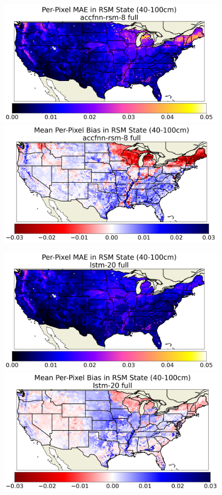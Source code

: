 \begin{figure}[hp!]
    \centering

    \includegraphics[width=.48\linewidth,draft=false]{figures/grid-eval_best_full/eval-grid_full_accfnn-rsm-8_rsm-100_spatial-stats_abs-err_state-err-abs-mean.png}
    \includegraphics[width=.48\linewidth,draft=false]{figures/grid-eval_best_full/eval-grid_full_accfnn-rsm-8_rsm-100_spatial-stats_bias_state-err-bias-mean.png}

    \includegraphics[width=.48\linewidth,draft=false]{figures/grid-eval_best_full/eval-grid_full_lstm-20_rsm-100_spatial-stats_abs-err_state-err-abs-mean.png}
    \includegraphics[width=.48\linewidth,draft=false]{figures/grid-eval_best_full/eval-grid_full_lstm-20_rsm-100_spatial-stats_bias_state-err-bias-mean.png}


\end{figure}

